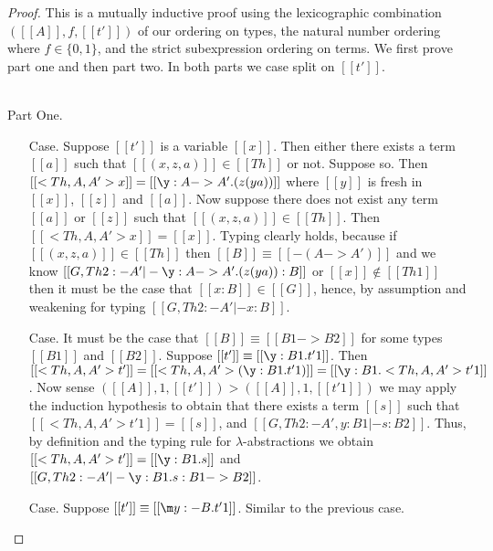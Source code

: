 \begin{proof}
  This is a mutually inductive proof using the lexicographic combination
  $([[A]], f,[[t']])$ of our ordering on types,
  the natural number ordering where $f \in \{0,1\}$, and
  the strict subexpression ordering on terms. We first prove part one
  and then part two.  In both parts we case split on $[[t']]$.

  \ \\
  \noindent Part One.
  \begin{itemize}
  \item[Case.] Suppose $[[t']]$ is a variable $[[x]]$.  Then either there exists
    a term $[[a]]$ such that $[[(x,z,a)]] \in [[Th]]$ or not.  Suppose so. Then 
    $[[<Th,A,A'>x]] = [[\y:A->A'.(z (y a))]]$ where $[[y]]$ is fresh in $[[x]]$, $[[z]]$ and $[[a]]$.
    Now suppose there does not exist any term $[[a]]$ or $[[z]]$ such that $[[(x,z,a)]] \in [[Th]]$.  Then
    $[[<Th,A,A'>x]] = [[x]]$. Typing clearly holds, because if $[[(x,z,a)]] \in [[Th]]$ then 
    $[[B]] \equiv [[{-(A->A')}]]$ and we know $[[G,Th 2:{-A'} |- \y:A->A'.(z (y a)) : B]]$ or
    $[[x]] \not\in [[Th 1]]$ then it must be the case that $[[x:B]] \in [[G]]$, hence,
    by assumption and weakening for typing $[[G,Th 2:{-A'} |- x : B]]$.

  \item[Case.] It must be the case that $[[B]] \equiv [[B1 -> B2]]$ for some types $[[B1]]$ and
    $[[B2]]$.  Suppose $[[t']] \equiv [[\y:B1.t'1]]$. Then 
    $[[<Th,A,A'>t']] = [[<Th ,A,A'>(\y:B1.t'1)]] = [[\y:B1.<Th,A,A'>t'1]]$.  Now sense
    $([[A]],1,[[t']]) > ([[A]],1,[[t'1]])$ we may apply the induction hypothesis to obtain
    that there exists a term $[[s]]$ such that $[[<Th,A,A'>t'1]] = [[s]]$, and $[[G,Th 2:{-A'},y:B1 |- s : B2]]$.
    Thus, by definition and the typing rule for $\lambda$-abstractions we obtain $[[<Th,A,A'>t']] = [[\y:B1.s]]$
    and $[[G,Th 2:{-A'} |- \y:B1.s:B1 -> B2]]$.

  \item[Case.] Suppose $[[t']] \equiv [[\m y:{-B}.t'1]]$. Similar to the previous case.


\end{itemize}
\end{proof}
